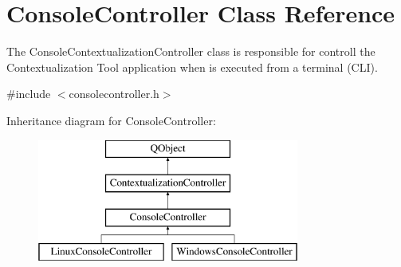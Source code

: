 \hypertarget{classConsoleController}{}\section{Console\+Controller Class Reference}
\label{classConsoleController}


The Console\+Contextualization\+Controller class is responsible for controll the Contextualization Tool application when is executed from a terminal (C\+LI).  




{\ttfamily \#include $<$consolecontroller.\+h$>$}

Inheritance diagram for Console\+Controller\+:\begin{figure}[H]
\begin{center}
\leavevmode
\includegraphics[height=4.000000cm]{classConsoleController}
\end{center}
\end{figure}
